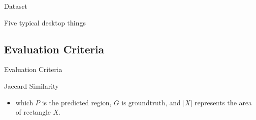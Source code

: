 \documentclass[xcolor=table,compress,blue]{beamer}
\begin{document}
\begin{frame}{Dataset}
	\begin{exampleblock}{Five typical desktop things}
		\begin{figure}[htpb]
			\centering
		
			\label{fig:ResultShow} %
		\end{figure}
	\end{exampleblock}
\end{frame}

\subsection{Evaluation Criteria}
\begin{frame}{Evaluation Criteria}
	\begin{exampleblock}{Jaccard Similarity}
		\begin{itemize}
			\item \large{which $P$ is the predicted region, 
				$G$ is groundtruth, and $|X|$ represents the area of rectangle $X$.}
		\end{itemize}
	\end{exampleblock}
\end{frame}
\end{document}
